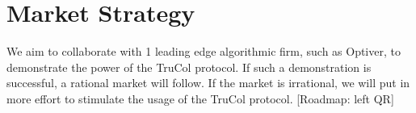 \vspace{-0.16cm}
\section{Market Strategy}
\vspace{-0.15cm}
We aim to collaborate with 1 leading edge algorithmic firm, such as Optiver, to demonstrate the power of the TruCol protocol. If such a demonstration is successful, a rational market will follow. If the market is irrational, we will put in more effort to stimulate the usage of the TruCol protocol. [Roadmap: left QR]
